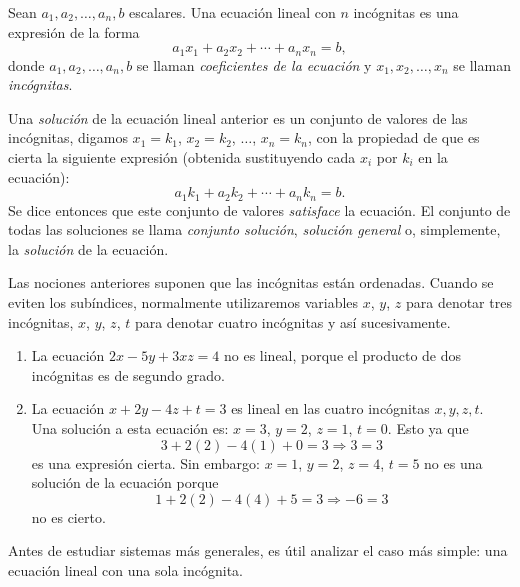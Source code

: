 \begin{definicion}{}{}
    Sean $a_1, a_2, \dots, a_n, b$ escalares. Una ecuación lineal con $n$ incógnitas es una expresión de la forma
    $$a_1x_1 + a_2x_2 + \cdots + a_nx_n = b,$$
    donde $a_1, a_2, \dots, a_n, b$ se llaman \emph{coeficientes de la ecuación} y $x_1, x_2, \dots, x_n$ se llaman \emph{incógnitas}.
\end{definicion}

Una \emph{solución} de la ecuación lineal anterior es un conjunto de valores de las incógnitas, digamos $x_1 = k_1$, $x_2 = k_2$, $\dots$, $x_n = k_n$, con la propiedad de que es cierta la siguiente expresión (obtenida sustituyendo cada $x_i$ por $k_i$ en la ecuación):
$$a_1 k_1 + a_2 k_2 + \cdots + a_n k_n = b.$$
\newpage\noindent
Se dice entonces que este conjunto de valores \emph{satisface} la ecuación. El conjunto de todas las soluciones se llama \emph{conjunto solución}, \emph{solución general} o, simplemente, la \emph{solución} de la ecuación.

Las nociones anteriores suponen que las incógnitas están ordenadas. Cuando se eviten los subíndices, normalmente utilizaremos variables $x$, $y$, $z$ para denotar tres incógnitas, $x$, $y$, $z$, $t$ para denotar cuatro incógnitas y así sucesivamente.

\begin{examplebox}{}{}
    \begin{enumerate}[label=\alph*), topsep=6pt, itemsep=0pt]
        \item La ecuación $2x - 5y + 3xz = 4$ no es lineal, porque el producto de dos incógnitas es de segundo grado.
        \item La ecuación $x + 2y - 4z + t = 3$ es lineal en las cuatro incógnitas $x, y, z, t$. Una solución a esta ecuación es: $x = 3$, $y = 2$, $z = 1$, $t = 0$. Esto ya que
        $$3 + 2(2) - 4(1) + 0 = 3 \Longrightarrow 3 = 3$$
        es una expresión cierta. Sin embargo: $x = 1$, $y = 2$, $z = 4$, $t = 5$ no es una solución de la ecuación porque
        $$1 + 2(2) - 4(4) + 5 = 3 \Longrightarrow -6 = 3$$
        no es cierto.
    \end{enumerate}
\end{examplebox}

Antes de estudiar sistemas más generales, es útil analizar el caso más simple: una ecuación lineal con una sola incógnita.

